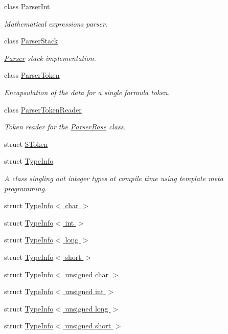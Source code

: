 \begin{DoxyCompactItemize}
class \hyperlink{classmu_1_1_parser_int}{Parser\+Int}
\begin{DoxyCompactList}\small\item\em Mathematical expressions parser. \end{DoxyCompactList}\item 
class \hyperlink{classmu_1_1_parser_stack}{Parser\+Stack}
\begin{DoxyCompactList}\small\item\em \hyperlink{classmu_1_1_parser}{Parser} stack implementation. \end{DoxyCompactList}\item 
class \hyperlink{classmu_1_1_parser_token}{Parser\+Token}
\begin{DoxyCompactList}\small\item\em Encapsulation of the data for a single formula token. \end{DoxyCompactList}\item 
class \hyperlink{classmu_1_1_parser_token_reader}{Parser\+Token\+Reader}
\begin{DoxyCompactList}\small\item\em Token reader for the \hyperlink{classmu_1_1_parser_base}{Parser\+Base} class. \end{DoxyCompactList}\item 
struct \hyperlink{structmu_1_1_s_token}{S\+Token}
\item 
struct \hyperlink{structmu_1_1_type_info}{Type\+Info}
\begin{DoxyCompactList}\small\item\em A class singling out integer types at compile time using template meta programming. \end{DoxyCompactList}\item 
struct \hyperlink{structmu_1_1_type_info_3_01char_01_4}{Type\+Info$<$ char $>$}
\item 
struct \hyperlink{structmu_1_1_type_info_3_01int_01_4}{Type\+Info$<$ int $>$}
\item 
struct \hyperlink{structmu_1_1_type_info_3_01long_01_4}{Type\+Info$<$ long $>$}
\item 
struct \hyperlink{structmu_1_1_type_info_3_01short_01_4}{Type\+Info$<$ short $>$}
\item 
struct \hyperlink{structmu_1_1_type_info_3_01unsigned_01char_01_4}{Type\+Info$<$ unsigned char $>$}
\item 
struct \hyperlink{structmu_1_1_type_info_3_01unsigned_01int_01_4}{Type\+Info$<$ unsigned int $>$}
\item 
struct \hyperlink{structmu_1_1_type_info_3_01unsigned_01long_01_4}{Type\+Info$<$ unsigned long $>$}
\item 
struct \hyperlink{structmu_1_1_type_info_3_01unsigned_01short_01_4}{Type\+Info$<$ unsigned short $>$}
\end{DoxyCompactItemize}

